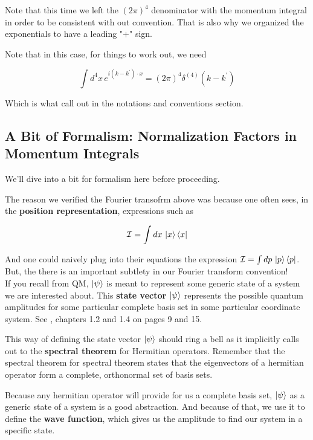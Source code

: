 Note that this time we left the $\left(2\pi\right)^4$ denominator with the momentum integral
in order to be consistent with out convention.
That is also why we organized the exponentials to have a leading "$+$" sign.

Note that in this case, for things to work out, we need

$$
\int d^4 x \, e^{i(k - k^\prime)\cdot x} = \left(2\pi\right)^4 \delta^{(4)} \left(k - k^\prime\right)
$$

Which is what \cite{peskin-and-schroeder} call out in the notations and conventions section.




\subsection{A Bit of Formalism: Normalization Factors in Momentum Integrals} \label{formalism:momentum-renormalization-factor}

We'll dive into a bit for formalism here before proceeding.

The reason we verified the Fourier transofrm above was because one often sees, in the
\textbf{position representation}, expressions such as

$$
\mathcal{I} = \int dx \, \ket{x}\bra{x}
$$

And one could naively plug into their equations the expression $\mathcal{I} = \int dp \, \ket{p}\bra{p}$.
But, the there is an important subtlety in our Fourier transform convention!
\\

If you recall from QM, $\ket{\psi}$ is meant to represent some generic state of a system
we are interested about.
This \textbf{state vector} $\ket{\psi}$ represents the possible quantum amplitudes for some particular
complete basis set in some particular coordinate system.
See \cite{binney}, chapters 1.2 and 1.4 on pages 9 and 15.

This way of defining the state vector $\ket{\psi}$
should ring a bell as it implicitly calls out to the \textbf{spectral theorem} for Hermitian operators.
Remember that the spectral theorem for spectral theorem states that the eigenvectors of a hermitian operator
form a complete, orthonormal set of basis sets.

Because any hermitian operator will provide for us a complete basis set, $\ket{\psi}$ as a generic
state of a system is a good abstraction.
And because of that, we use it to define the \textbf{wave function}, which gives us the amplitude to find
our system in a specific state.

